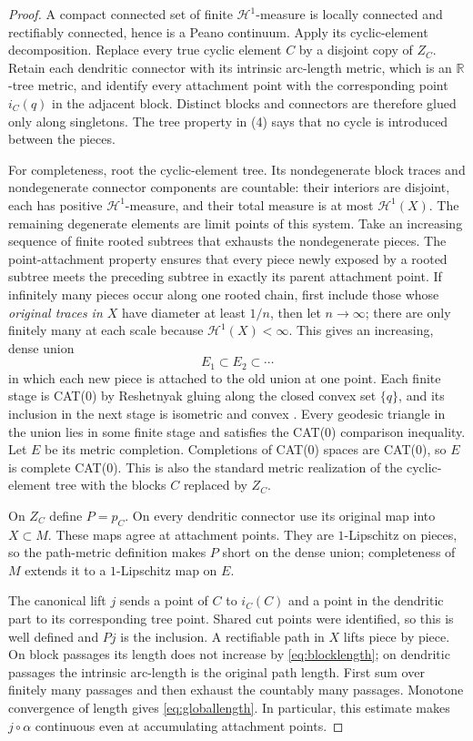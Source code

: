 \documentclass[11pt]{article}
\newcommand{\R}{\mathbb R}
\newcommand{\Hh}{\mathcal H}
\begin{document}
\begin{proof}
A compact connected set of finite $\Hh^1$-measure is locally connected and
rectifiably connected, hence is a Peano continuum.  Apply its cyclic-element
decomposition.  Replace every true cyclic element $C$ by a disjoint copy of
$Z_C$.  Retain each dendritic connector with its intrinsic arc-length metric,
which is an $\R$-tree metric, and identify every attachment point with the
corresponding point $i_C(q)$ in the adjacent block.  Distinct blocks and
connectors are therefore glued only along singletons.  The tree property in
(4) says that no cycle is introduced between the pieces.

For completeness, root the cyclic-element tree.  Its nondegenerate block
traces and nondegenerate connector components are countable: their interiors
are disjoint, each has positive $\Hh^1$-measure, and their total measure is at
most $\Hh^1(X)$.  The remaining degenerate elements are limit points of this
system.  Take an increasing sequence of finite rooted subtrees that exhausts
the nondegenerate pieces.  The point-attachment property ensures that every
piece newly exposed by a rooted subtree meets the preceding subtree in
exactly its parent attachment point.  If infinitely many pieces occur along
one rooted chain, first include those whose \emph{original traces in $X$}
have diameter at least $1/n$, then let $n\to\infty$; there are only finitely
many at each scale because $\Hh^1(X)<\infty$.  This gives an increasing,
dense union
\[
 E_1\subset E_2\subset\cdots
\]
in which each new piece is attached to the old union at one point.  Each
finite stage is CAT(0) by Reshetnyak gluing along the closed convex set
$\{q\}$, and its inclusion in the next stage is isometric and convex
\cite[Chapter~II.11]{BridsonHaefliger}.  Every geodesic triangle in the union
lies in some finite stage and satisfies the CAT(0) comparison inequality.
Let $E$ be its metric completion.  Completions of CAT(0) spaces are CAT(0),
so $E$ is complete CAT(0).  This is also the standard metric realization of
the cyclic-element tree with the blocks $C$ replaced by $Z_C$.

On $Z_C$ define $P=p_C$.  On every dendritic connector use its original map
into $X\subset M$.  These maps agree at attachment points.  They are
$1$-Lipschitz on pieces, so the path-metric definition makes $P$ short on the
dense union; completeness of $M$ extends it to a $1$-Lipschitz map on $E$.

The canonical lift $j$ sends a point of $C$ to $i_C(C)$ and a point in the
dendritic part to its corresponding tree point.  Shared cut points were
identified, so this is well defined and $Pj$ is the inclusion.  A rectifiable
path in $X$ lifts piece by piece.  On block passages its length does not
increase by \eqref{eq:blocklength}; on dendritic passages the intrinsic
arc-length is the original path length.  First sum over finitely many
passages and then exhaust the countably many passages.  Monotone convergence
of length gives \eqref{eq:globallength}.  In particular, this estimate makes
$j\circ\alpha$ continuous even at accumulating attachment points.
\end{proof}
\end{document}
